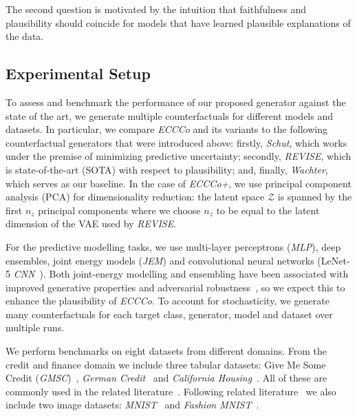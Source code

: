 \documentclass[letterpaper]{article} %
\begin{document}
The second question is motivated by the intuition that faithfulness and plausibility should coincide for models that have learned plausible explanations of the data.

\subsection{Experimental Setup}\label{emp:setup}

To assess and benchmark the performance of our proposed generator against the state of the art, we generate multiple counterfactuals for different models and datasets. In particular, we compare \textit{ECCCo} and its variants to the following counterfactual generators that were introduced above: firstly, \textit{Schut}, which works under the premise of minimizing predictive uncertainty; secondly, \textit{REVISE}, which is state-of-the-art (SOTA) with respect to plausibility; and, finally, \textit{Wachter}, which serves as our baseline. In the case of \textit{ECCCo+}, we use principal component analysis (PCA) for dimensionality reduction: the latent space $\mathcal{Z}$ is spanned by the first $n_z$ principal components where we choose $n_z$ to be equal to the latent dimension of the VAE used by \textit{REVISE}.

For the predictive modelling tasks, we use multi-layer perceptrons (\textit{MLP}), deep ensembles, joint energy models (\textit{JEM}) and convolutional neural networks (LeNet-5 \textit{CNN}~\citep{lecun1998gradient}). Both joint-energy modelling and ensembling have been associated with improved generative properties and adversarial robustness~\citep{grathwohl2020your,lakshminarayanan2016simple}, so we expect this to enhance the plausibility of \textit{ECCCo}. To account for stochasticity, we generate many counterfactuals for each target class, generator, model and dataset over multiple runs.

We perform benchmarks on eight datasets from different domains. From the credit and finance domain we include three tabular datasets: Give Me Some Credit (\textit{GMSC})~\citep{kaggle2011give}, \textit{German Credit}~\citep{hoffman1994german} and \textit{California Housing}~\citep{pace1997sparse}. All of these are commonly used in the related literature~\citep{karimi2020survey,altmeyer2023endogenous,pawelczyk2021carla}. Following related literature~\citep{schut2021generating,dhurandhar2018explanations} we also include two image datasets: \textit{MNIST}~\citep{lecun1998mnist} and \textit{Fashion MNIST}~\citep{xiao2017fashion}. 
\end{document}

